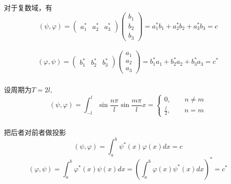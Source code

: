 \begin{frame} 
    ~~\\ 
    \解 对于复数域，有 \[(\psi, \varphi) = \begin{pmatrix}
        a_1 ^* &
        a_2 ^* &
        a_3 ^*
    \end{pmatrix}
        \begin{pmatrix}
        b_1\\
        b_2\\
        b_3
    \end{pmatrix}
    =a_1 ^* b_1 +a_2 ^* b_2 +a_3 ^* b_3
    =c 
    \]
    ~ \[(\varphi,\psi) = \begin{pmatrix}
        b_1 ^* &
        b_2 ^* &
        b_3 ^*
    \end{pmatrix}
        \begin{pmatrix}
        a_1\\
        a_2\\
        a_3
    \end{pmatrix}
    =b_1 ^* a_1 +b_2 ^* a_2 +b_3 ^* a_3
    =c^* 
    \]
\end{frame} 

\begin{frame} 
    \frametitle{}
    \例 [4. 求定义在实数空间的两函数的内积]{\[\psi(x)=\sin \frac{n\pi}{l}x, \varphi(x)=\sin \frac{m\pi}{l}x\]}
    \解 设周期为$T=2l$, ~ \[(\psi, \varphi)=\int_{-l} ^{l} \sin \frac{n\pi}{l} \sin \frac{m\pi}{l}x=\begin{cases}
         0, \qquad n\neq m \\
        \frac{l}{2} , \qquad n=m
    \end{cases}
    \]
\end{frame} 

\begin{frame} 
    \frametitle{}
    \例 [5. 求定义在复数空间的两函数的内积]{}
    \解 把后者对前者做投影 \[(\psi, \varphi)=\int_a ^b \psi^*(x)  \varphi(x) dx=c\]
    \[(\varphi,\psi)=\int_a ^b \varphi^*(x)\psi(x) dx = (\int_a ^b \varphi(x)\psi^*(x) dx) ^* =c^*\]
\end{frame} 

